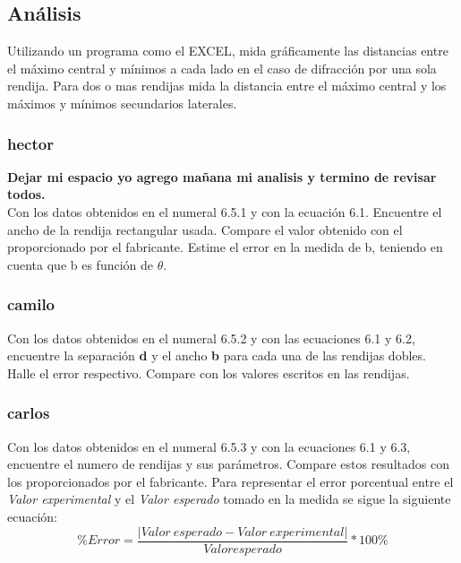 \documentclass{article}									%
\begin{document}
\subsection{Análisis}
Utilizando un programa como el EXCEL, mida gráficamente las distancias entre el máximo central y mínimos a cada lado en el caso de difracción por una sola rendija. Para dos o mas rendijas mida la distancia entre el máximo central y los máximos y mínimos secundarios laterales.
\subsubsection{hector}
\textbf{Dejar mi espacio yo agrego mañana mi analisis y termino de revisar todos.}\\
Con los datos obtenidos en el numeral 6.5.1 y con la ecuación 6.1. Encuentre el ancho de la rendija rectangular usada. Compare el valor obtenido con el proporcionado por el fabricante. Estime el error en la medida de b, teniendo en cuenta que b es función de  $\theta$.
\subsubsection{camilo}
Con los datos obtenidos en el numeral 6.5.2 y con las ecuaciones 6.1 y 6.2,
encuentre la separación \textbf{d} y el ancho \textbf{b} para cada una de las rendijas dobles. Halle el error respectivo. Compare con los valores escritos en las rendijas.

\subsubsection{carlos}
Con los datos obtenidos en el numeral 6.5.3 y con la ecuaciones 6.1 y 6.3,
encuentre el numero de rendijas y sus parámetros. Compare estos resultados con los proporcionados por el fabricante.
Para representar el error porcentual entre el \emph{Valor experimental} y el \emph{Valor esperado} tomado en la medida se sigue la siguiente ecuación:
\begin{equation}
    \% Error = \frac{|Valor \ esperado-Valor \ experimental|}{Valor esperado}*100\%
\end{equation}
\end{document}
